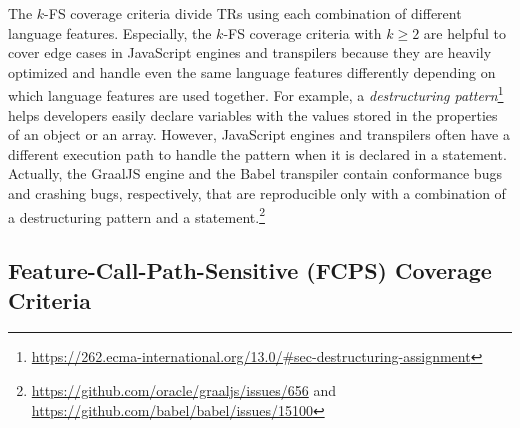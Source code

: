 
The $k$-FS coverage criteria divide TRs using each combination of different
language features.
%
Especially, the $k$-FS coverage criteria with $k \geq 2$ are helpful to cover
edge cases in JavaScript engines and transpilers because they are heavily
optimized and handle even the same language features differently depending on which
language features are used together.
%
For example, a \textit{destructuring pattern}\footnote{
  \url{https://262.ecma-international.org/13.0/\#sec-destructuring-assignment}
} helps developers easily declare variables with the values stored in the
properties of an object or an array.
%
However, JavaScript engines and transpilers often have a different execution
path to handle the pattern when it is declared in a  statement.
%
Actually, the GraalJS engine and the Babel transpiler contain conformance bugs
and crashing bugs, respectively, that are reproducible only with a combination
of a destructuring pattern and a  statement.\footnote{
  \url{https://github.com/oracle/graaljs/issues/656} and
  \url{https://github.com/babel/babel/issues/15100}
}


\subsection{Feature-Call-Path-Sensitive (FCPS) Coverage
Criteria}\label{sec:fcps-cov}

